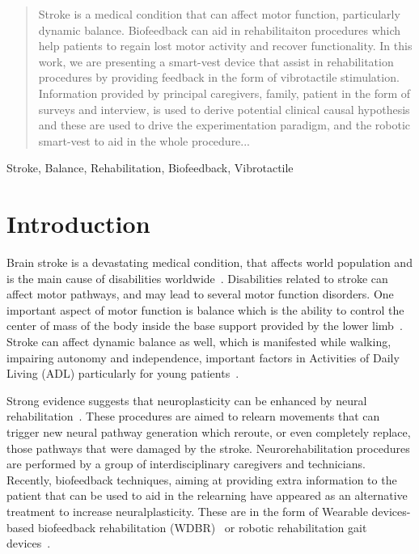 \documentclass[conference]{IEEEtran}
\begin{document}
\maketitle

\begin{abstract}
Stroke is a medical condition that can affect motor function, particularly dynamic balance.  Biofeedback can aid in rehabilitaiton procedures which help patients to regain lost motor activity and recover functionality.  In this work, we are presenting a smart-vest device that assist in rehabilitation procedures by providing feedback in the form of vibrotactile stimulation. Information provided by principal caregivers, family, patient in the form of surveys and interview, is used to derive potential clinical causal hypothesis and these are used to drive the experimentation paradigm, and the robotic smart-vest to aid in the whole procedure...
\end{abstract}

\begin{IEEEkeywords}
Stroke, Balance, Rehabilitation, Biofeedback, Vibrotactile
\end{IEEEkeywords}

\section{Introduction}

Brain stroke is a devastating medical condition, that affects world population and is the main cause of disabilities worldwide~\cite{Caplan.etal2023}.  Disabilities related to stroke can affect motor pathways, and may lead to several motor function disorders.   One important aspect of motor function is balance which is the ability to control the center of mass of the body inside the base support provided by the lower limb~\cite{Bowman2021}.  Stroke can affect dynamic balance as well,  which is manifested while walking, impairing autonomy and independence, important factors in Activities of Daily Living (ADL) particularly for young patients~\cite{Afrasiabifar.etal2020,Donato.etal2016}.


Strong evidence suggests that neuroplasticity can be enhanced by neural rehabilitation~\cite{DeAngelis.etal2021,Albert.etal2012}.  These procedures are aimed to relearn movements that can trigger new neural pathway generation which reroute, or even completely replace, those pathways that were damaged by the stroke.  Neurorehabilitation procedures are performed by a group of interdisciplinary caregivers and technicians.  Recently, biofeedback techniques, aiming at providing extra information to the patient that can be used to aid in the relearning have appeared as an alternative treatment to increase neuralplasticity. These are in the form of Wearable devices-based biofeedback rehabilitation (WDBR)~\cite{Peake.etal2018} or robotic rehabilitation gait devices~\cite{Zhao.etal2022,Peshkin.etal2005,Tong.etal2006}.  
\end{document}
